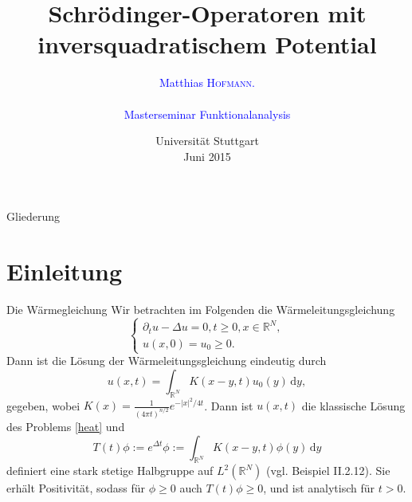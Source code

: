 \documentclass[handout]{beamer}
\theoremstyle{break}
\begin{document}
\title[Schrödinger-Operatoren]{Schrödinger-Operatoren mit inversquadratischem Potential} 
\author[\textsc{Hofmann}]{\textcolor{blue}{Matthias \textsc{Hofmann}.\\ \ \\
Masterseminar Funktionalanalysis
}}
 \date{Universität Stuttgart\\ Juni 2015} 
 \begin{frame}
\titlepage	
\end{frame}

\begin{frame}{Gliederung}
  \tableofcontents
\end{frame}

\section{Einleitung}
\begin{frame}{Die Wärmegleichung}
Wir betrachten im Folgenden die W\"armeleitungsgleichung
\begin{equation}\label{heat}
\begin{cases}
\partial_t u - \Delta u =0, t\ge 0, x\in \mathbb R^N,\\
u(x,0)=u_0 \ge 0.
\end{cases}
\end{equation} \pause
Dann ist die L\"osung der W\"armeleitungsgleichung eindeutig durch
\begin{equation}
u(x,t)=\int_{\mathbb R^N} K(x-y, t) u_0(y) \, \mathrm dy,
\end{equation}
gegeben, wobei $K(x)=\frac{1}{(4\pi t)^{n/2}} e^{-|x|^2/4t}$. \pause Dann ist $u(x,t)$ die klassische L\"osung des Problems \eqref{heat} 
und
\begin{equation}
T(t)\phi:=e^{\Delta t}\phi:=\int_{\mathbb R^N} K(x-y,t) \phi(y)\, \mathrm dy 
\end{equation}
definiert eine stark stetige Halbgruppe auf $L^2(\mathbb R^N)$ (vgl. \cite{engel-nagel} Beispiel II.2.12). Sie erh\"alt Positivit\"at, sodass f\"ur $\phi \ge 0$ auch $T(t) \phi \ge 0$, und ist analytisch f\"ur $t>0$.
\end{frame}
\end{document}
